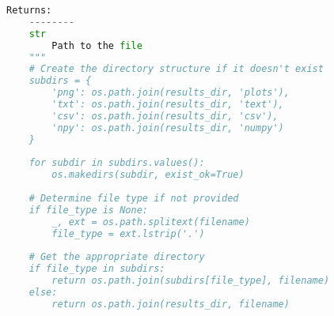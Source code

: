 \begin{lstlisting}[language=Python]
    Returns:
    --------
    str
        Path to the file
    """
    # Create the directory structure if it doesn't exist
    subdirs = {
        'png': os.path.join(results_dir, 'plots'),
        'txt': os.path.join(results_dir, 'text'),
        'csv': os.path.join(results_dir, 'csv'),
        'npy': os.path.join(results_dir, 'numpy')
    }
    
    for subdir in subdirs.values():
        os.makedirs(subdir, exist_ok=True)
    
    # Determine file type if not provided
    if file_type is None:
        _, ext = os.path.splitext(filename)
        file_type = ext.lstrip('.')
    
    # Get the appropriate directory
    if file_type in subdirs:
        return os.path.join(subdirs[file_type], filename)
    else:
        return os.path.join(results_dir, filename)
\end{lstlisting}
